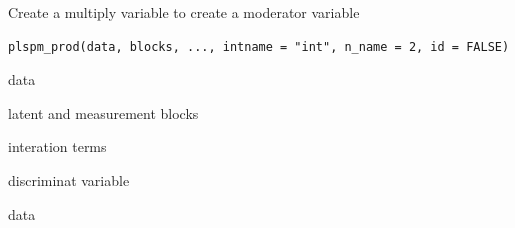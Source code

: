 \documentclass[a4paper]{book}
\begin{document}
%
\begin{Description}
Create a multiply variable to create a moderator variable
\end{Description}
%
\begin{Usage}
\begin{verbatim}
plspm_prod(data, blocks, ..., intname = "int", n_name = 2, id = FALSE)
\end{verbatim}
\end{Usage}
%
\begin{Arguments}
\begin{ldescription}
\item[\code{data}] data

\item[\code{blocks}] latent and measurement blocks

\item[\code{...}] interation terms

\item[\code{id}] discriminat variable
\end{ldescription}
\end{Arguments}
%
\begin{Value}
data
\end{Value}
%
\end{document}
